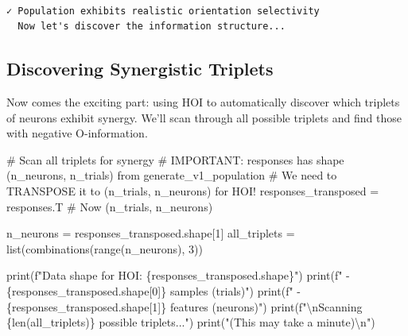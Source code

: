 \documentclass[
  11pt,
  letterpaper,
  oneside,
  openany]{book}
\newenvironment{Shaded}{\begin{snugshade}}{\end{snugshade}}
\newcommand{\BuiltInTok}[1]{\textcolor[rgb]{0.00,0.23,0.31}{#1}}
\newcommand{\CharTok}[1]{\textcolor[rgb]{0.13,0.47,0.30}{#1}}
\newcommand{\CommentTok}[1]{\textcolor[rgb]{0.37,0.37,0.37}{#1}}
\newcommand{\DecValTok}[1]{\textcolor[rgb]{0.68,0.00,0.00}{#1}}
\newcommand{\NormalTok}[1]{\textcolor[rgb]{0.00,0.23,0.31}{#1}}
\newcommand{\OperatorTok}[1]{\textcolor[rgb]{0.37,0.37,0.37}{#1}}
\newcommand{\SpecialCharTok}[1]{\textcolor[rgb]{0.37,0.37,0.37}{#1}}
\newcommand{\SpecialStringTok}[1]{\textcolor[rgb]{0.13,0.47,0.30}{#1}}
\newcommand{\StringTok}[1]{\textcolor[rgb]{0.13,0.47,0.30}{#1}}
\begin{document}
\begin{verbatim}

✓ Population exhibits realistic orientation selectivity
  Now let's discover the information structure...
\end{verbatim}

\subsection{Discovering Synergistic
Triplets}\label{discovering-synergistic-triplets}

Now comes the exciting part: using HOI to automatically discover which
triplets of neurons exhibit synergy. We'll scan through all possible
triplets and find those with negative O-information.

\begin{Shaded}
\begin{Highlighting}[]
\CommentTok{\# Scan all triplets for synergy}
\CommentTok{\# IMPORTANT: responses has shape (n\_neurons, n\_trials) from generate\_v1\_population}
\CommentTok{\# We need to TRANSPOSE it to (n\_trials, n\_neurons) for HOI!}
\NormalTok{responses\_transposed }\OperatorTok{=}\NormalTok{ responses.T  }\CommentTok{\# Now (n\_trials, n\_neurons)}

\NormalTok{n\_neurons }\OperatorTok{=}\NormalTok{ responses\_transposed.shape[}\DecValTok{1}\NormalTok{]}
\NormalTok{all\_triplets }\OperatorTok{=} \BuiltInTok{list}\NormalTok{(combinations(}\BuiltInTok{range}\NormalTok{(n\_neurons), }\DecValTok{3}\NormalTok{))}

\BuiltInTok{print}\NormalTok{(}\SpecialStringTok{f"Data shape for HOI: }\SpecialCharTok{\{}\NormalTok{responses\_transposed}\SpecialCharTok{.}\NormalTok{shape}\SpecialCharTok{\}}\SpecialStringTok{"}\NormalTok{)}
\BuiltInTok{print}\NormalTok{(}\SpecialStringTok{f"  {-} }\SpecialCharTok{\{}\NormalTok{responses\_transposed}\SpecialCharTok{.}\NormalTok{shape[}\DecValTok{0}\NormalTok{]}\SpecialCharTok{\}}\SpecialStringTok{ samples (trials)"}\NormalTok{)}
\BuiltInTok{print}\NormalTok{(}\SpecialStringTok{f"  {-} }\SpecialCharTok{\{}\NormalTok{responses\_transposed}\SpecialCharTok{.}\NormalTok{shape[}\DecValTok{1}\NormalTok{]}\SpecialCharTok{\}}\SpecialStringTok{ features (neurons)"}\NormalTok{)}
\BuiltInTok{print}\NormalTok{(}\SpecialStringTok{f"}\CharTok{\textbackslash{}n}\SpecialStringTok{Scanning }\SpecialCharTok{\{}\BuiltInTok{len}\NormalTok{(all\_triplets)}\SpecialCharTok{\}}\SpecialStringTok{ possible triplets..."}\NormalTok{)}
\BuiltInTok{print}\NormalTok{(}\StringTok{"(This may take a minute)}\CharTok{\textbackslash{}n}\StringTok{"}\NormalTok{)}


\end{Highlighting}
\end{Shaded}
\end{document}
